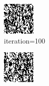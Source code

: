 \documentclass{article}
\begin{document}
\begin{figure}[h]
\begin{subfigure}[t]{0.18\textwidth}
\includegraphics[width=\textwidth]{./computational/results/gibbs_comb_sampler_positive_iter_100.png}
\vspace{-0.6cm}
\caption{iteration=100}
\end{subfigure}\hspace{0.01\textwidth}
\begin{subfigure}[t]{0.18\textwidth}
\centering
\includegraphics[width=\textwidth]{./computational/results/gibbs_comb_sampler_positive_iter_200.png}

\end{subfigure}
\end{figure}
\end{document}
